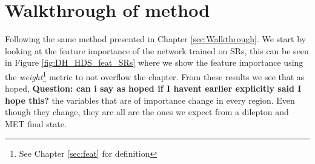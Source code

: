 \documentclass[12pt, a4paper]{book}
\begin{document}
\section{Walkthrough of method}
Following the same method presented in Chapter \ref{sec:Walkthrough}. We start by looking at the feature importance of the network trained on SRs, this can be seen in Figure \ref{fig:DH_HDS_feat_SRs} where we show the feature importance using the \textit{weight}\footnote{See Chapter \ref{sec:feat} for definition} metric to not overflow the chapter. 
From these results we see that as hoped, \textbf{Question: can i say as hoped if I havent earlier explicitly said I hope this?} the variables that are of importance change in every region. Even though they change, they are all are the ones we expect from a dilepton and MET final state.\\
\end{document}
